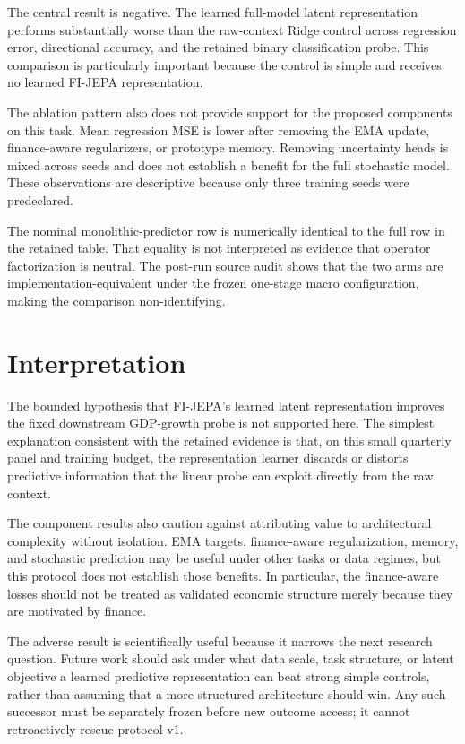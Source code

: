 \documentclass[11pt]{article}
\begin{document}


The central result is negative. The learned full-model latent representation performs substantially worse than the raw-context Ridge control across regression error, directional accuracy, and the retained binary classification probe. This comparison is particularly important because the control is simple and receives no learned FI-JEPA representation.

The ablation pattern also does not provide support for the proposed components on this task. Mean regression MSE is lower after removing the EMA update, finance-aware regularizers, or prototype memory. Removing uncertainty heads is mixed across seeds and does not establish a benefit for the full stochastic model. These observations are descriptive because only three training seeds were predeclared.

The nominal monolithic-predictor row is numerically identical to the full row in the retained table. That equality is not interpreted as evidence that operator factorization is neutral. The post-run source audit shows that the two arms are implementation-equivalent under the frozen one-stage macro configuration, making the comparison non-identifying.

\section{Interpretation}
The bounded hypothesis that FI-JEPA's learned latent representation improves the fixed downstream GDP-growth probe is not supported here. The simplest explanation consistent with the retained evidence is that, on this small quarterly panel and training budget, the representation learner discards or distorts predictive information that the linear probe can exploit directly from the raw context.

The component results also caution against attributing value to architectural complexity without isolation. EMA targets, finance-aware regularization, memory, and stochastic prediction may be useful under other tasks or data regimes, but this protocol does not establish those benefits. In particular, the finance-aware losses should not be treated as validated economic structure merely because they are motivated by finance.

The adverse result is scientifically useful because it narrows the next research question. Future work should ask under what data scale, task structure, or latent objective a learned predictive representation can beat strong simple controls, rather than assuming that a more structured architecture should win. Any such successor must be separately frozen before new outcome access; it cannot retroactively rescue protocol v1.
\end{document}
